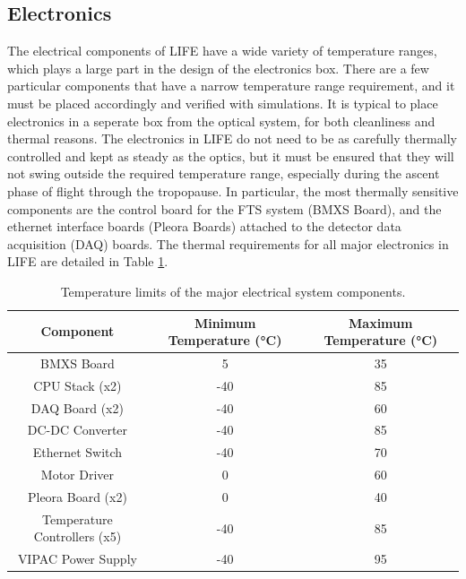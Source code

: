 \subsection{Electronics}\label{electronics_reqs}
The electrical components of LIFE have a wide variety of temperature ranges, which plays a large part in the design of the electronics box. There are a few particular components that have a narrow temperature range requirement, and it must be placed accordingly and verified with simulations. It is typical to place electronics in a seperate box from the optical system, for both cleanliness and thermal reasons. The electronics in LIFE do not need to be as carefully thermally controlled and kept as steady as the optics, but it must be ensured that they will not swing outside the required temperature range, especially during the ascent phase of flight through the tropopause. In particular, the most  thermally sensitive components are the control board for the FTS system (BMXS Board), and the ethernet interface boards (Pleora Boards) attached to the detector data acquisition (DAQ) boards. The thermal requirements for all major electronics in LIFE are detailed in Table \ref{therm_req_table}. 

\begin{table}[h]
\begin{center}
\begin{tabular}{ |c|c|c| }
 \hline
 \rowcolor{lightgray}
 Component & Minimum Temperature (°C) & Maximum Temperature (°C)\\
  \hline
  \hline
 BMXS Board  & 5 & 35 \\
 \hline
 CPU Stack (x2)  & -40 & 85 \\
 \hline
 DAQ Board (x2)  & -40 & 60 \\
 \hline
 DC-DC Converter & -40 & 85 \\
 \hline
 Ethernet Switch & -40 & 70 \\
 \hline
 Motor Driver & 0 & 60 \\
 \hline
 Pleora Board (x2)  & 0 & 40 \\
 \hline
 Temperature Controllers (x5) & -40 & 85 \\
 \hline
 VIPAC Power Supply & -40 & 95 \\
 \hline
\end{tabular}
\end{center}
\caption{Temperature limits of the major electrical system components.}
 \label{therm_req_table}
\end{table}

